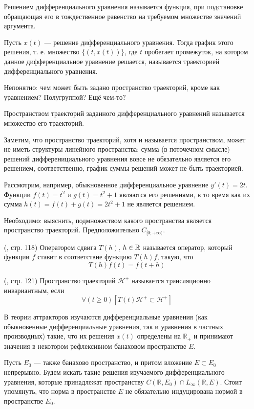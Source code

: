 
\LARGE





\opred
Решением дифференциального уравнения называется функция, при подстановке обращающая его в тождественное равенство на требуемом множестве значений аргумента.

\opred
Пусть $x(t)$ --- решение дифференциального уравнения.
Тогда график этого решения, т. е. множество $\{(t,x(t))\}$,
где $t$ пробегает промежуток, на котором данное дифференциальное уравнение решается,
называется траекторией дифференциального уравнения.


Непонятно: чем может быть задано пространство траекторий, кроме как уравнением?
Полугруппой?
Ещё чем-то?


\opred
Пространством траекторий заданного дифференциального уравнений называется множество его траекторий.

Заметим, что пространство траекторий, хотя и называется пространством, может не иметь структуры линейного пространства:
сумма (в поточечном смысле) решений дифференициального уравнения вовсе не обязательно является его решением,
соответственно, график суммы решений может не быть траекторией.

Рассмотрим, например, обыкновенное дифференциальное уравнение $y'(t) = 2t$.
Функции $f(t)=t^2$ и $g(t)=t^2 +1$ являются его решениями, в то время как их сумма $h(t) = f(t) + g(t) = 2t^2 + 1$ не является решением.


Необходимо: выяснить, подмножеством какого пространства является пространство траекторий.
Предположительно $C_{[0;+\infty)}$.




\opred (\cite{Zelenaya}, стр. 118)
Оператором сдвига $T(h)$, $h\in\mathbb{R}$ называется оператор, который функции $f$ ставит в соответствие функцию $T(h)f$, такую, что
$$
T(h)f(t)=f(t+h)
$$


\opred (\cite{Zelenaya}, стр. 121)
Пространство траекторий $\mathcal{H}^+$ называется трансляционно инвариантным, если
$$
\forall(t \geq 0)\left[T(t)\mathcal{H}^+ \subset \mathcal{H}^+ \right]
$$


В теории аттракторов изучаются дифференциальные уравнения (как обыкновенные дифференциальные уравнения, так и уравнения в частных производных) такие, что их решения $x(t)$ определены на $\mathbb{R}_+$ и принимают значения в некотором рефлексивном банаховом пространстве $E$.

Пусть $E_0$ --- также банахово пространство, и притом вложение $E \subset E_0$ непрерывно.
Будем искать такие решения изучаемого дифференциального уравнения, которые принадлежат пространству $C(\mathbb{R},E_0) \cap L_\infty(\mathbb{R},E)$.
Стоит упомянуть, что норма в пространстве $E$ не обязательно индуцирована нормой в пространстве $E_0$.

